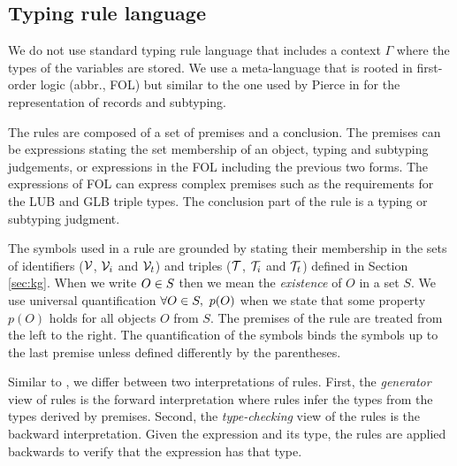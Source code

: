 \documentclass[runningheads]{llncs}
\newcommand{\V}{{\cal V}}
\newcommand{\T}{{\cal T}}
\newcommand{\memo}[1]{}
\begin{document}
\subsection{Typing rule language}

\memo{
In this paper we define typing of a data language used to represent an
ABOX \cite{Brachman2004KnowledgeRR} of a knowledge base given in a
form of a knowledge graph. The data language specifys the assertions
in the form of ground triples (ABOX) and the schema of assertions as
the types of triples (TBOX). The ground triples are the instances of
the triple types that altogether define the schema of a KG.}

We do not use standard typing rule language
\cite{Pierce2002,Hindley1997} that includes a context $\Gamma$ where
the types of the variables are stored. We use a meta-language that is
rooted in first-order logic (abbr., FOL) but similar to the one used by
Pierce in \cite{Pierce2002} for the representation of records and
subtyping.

The rules are composed of a set of premises and a conclusion. The
premises can be expressions stating the set membership of an object,
typing and subtyping judgements, or expressions in the FOL including
the previous two forms. The expressions of FOL can express complex
premises such as the requirements for the LUB and GLB triple
types. The conclusion part of the rule is a typing or subtyping
judgment.

The symbols used in a rule are grounded by stating their membership in
the sets of identifiers ($\V$, $\V_i$ and $\V_t$) and triples ($\T$,
$\T_i$ and $\T_t$) defined in Section \ref{sec:kg}. When we write
$O\in\/S$ then we mean the \emph{existence} of $O$ in a set $S$. We
use universal quantification $\forall\/O\in\/S,\ p(O)$ when we state
that some property $p(O)$ holds for all objects $O$ from $S$. The
premises of the rule are treated from the left to the right. The
quantification of the symbols binds the symbols up to the last premise
unless defined differently by the parentheses.

Similar to \cite{Dunfield2021}, we differ between two interpretations
of rules. First, the \emph{generator} view of rules is the forward
interpretation where rules infer the types from the types derived by
premises. Second, the \emph{type-checking} view of the rules is the
backward interpretation. Given the expression and its type, the rules
are applied backwards to verify that the expression has that type.
\end{document}
